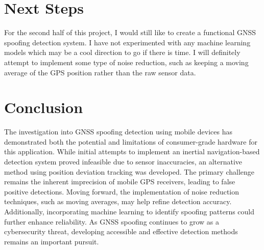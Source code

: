 \documentclass[conference]{IEEEtran}
\begin{document}
\section{Next Steps}
For the second half of this project, I would still like to create a functional GNSS spoofing detection system.  I have not experimented with any machine learning models which may be a cool direction to go if there is time. I will definitely attempt to implement some type of noise reduction, such as keeping a moving average of the GPS position rather than the raw sensor data.

\section{Conclusion}
The investigation into GNSS spoofing detection using mobile devices has demonstrated both the potential and limitations of consumer-grade hardware for this application. While initial attempts to implement an inertial navigation-based detection system proved infeasible due to sensor inaccuracies, an alternative method using position deviation tracking was developed. The primary challenge remains the inherent imprecision of mobile GPS receivers, leading to false positive detections. Moving forward, the implementation of noise reduction techniques, such as moving averages, may help refine detection accuracy. Additionally, incorporating machine learning to identify spoofing patterns could further enhance reliability. As GNSS spoofing continues to grow as a cybersecurity threat, developing accessible and effective detection methods remains an important pursuit.



\nocite{*}

\balance
\end{document}
